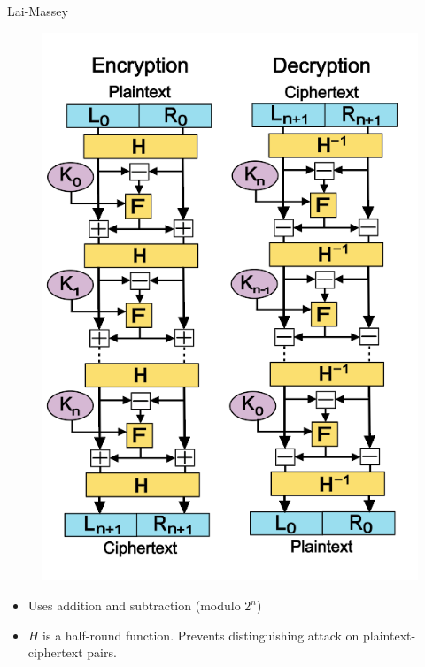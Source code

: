 \documentclass[12pt]{beamer}
\begin{document}
\begin{frame}{Lai-Massey}
	\centering
	\begin{minipage}{0.45\textwidth}
		\begin{figure}[h!]
			\centering
			\includegraphics[width=\textwidth,height=0.8\textheight,keepaspectratio]{lai-massey}
		\end{figure}
	\end{minipage}
	\begin{minipage}{0.45\textwidth}
		\begin{itemize}
			\item Uses addition and subtraction (modulo $2^n$)
			\item $H$ is a half-round function. Prevents distinguishing attack
				on plaintext-ciphertext pairs.
		\end{itemize}
	\end{minipage}
\end{frame}
\end{document}
